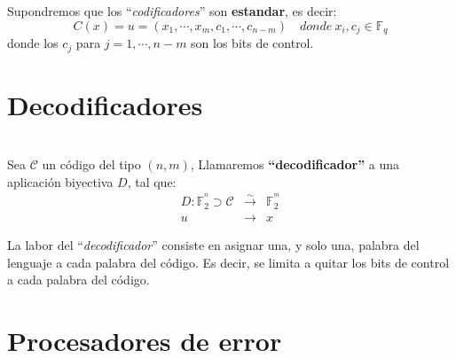 Supondremos que los ``\emph{codificadores}'' son \textbf{estandar}, es decir:
\begin{displaymath}
C(x)=u=(x_1,\cdots,x_m,c_1,\cdots,c_{n-m})\quad donde\ x_i,c_j\in \mathbb{F}_q
\end{displaymath}
donde los $c_j$ para $j=1,\cdots,n-m$ son los bits de control.

\section{Decodificadores} \label{sec:Decodificadores}
\begin{definicion}[Decodificador]
\ \\
Sea $\mathcal{C}$ un c\'odigo del tipo $(n,m)$, Llamaremos
\textbf{``decodificador''} a una aplicaci\'on biyectiva $D$, tal que:
\begin{eqnarray*}
D:\mathbb{F}^{^n}_2 \supset \mathcal{C}&\stackrel{\sim}\longrightarrow & \mathbb{F}^{^m}_2 \\
 u&\longrightarrow & x
\end{eqnarray*}
\end{definicion}
La labor del ``\emph{decodificador}'' consiste en asignar una, y solo una,
palabra del lenguaje a cada palabra del c\'odigo. Es decir, se limita a quitar
los bits de control a cada palabra del c\'odigo.

\section{Procesadores de error}\label{sec:ProcErr}

